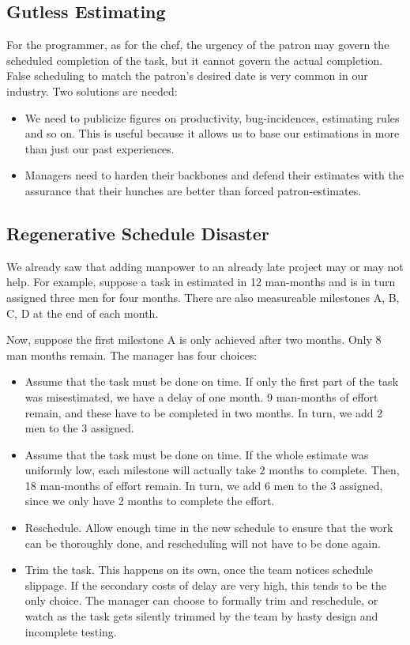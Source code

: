\documentclass[letterpaper,12pt,parskip=full]{article}
\begin{document}
\subsection{Gutless Estimating}

For the programmer, as for the chef, the urgency of the patron may govern the scheduled completion of the task, but it cannot govern the actual completion. False scheduling to match the patron’s desired date is very common in our industry. Two solutions are needed:

\begin{itemize}
	\item We need to publicize figures on productivity, bug-incidences, estimating rules and so on. This is useful because it allows us to base our estimations in more than just our past experiences.
	\item Managers need to harden their backbones and defend their estimates with the assurance that their hunches are better than forced patron-estimates.
\end{itemize}

\subsection{Regenerative Schedule Disaster}

We already saw that adding manpower to an already late project may or may not help. For example, suppose a task in estimated in 12 man-months and is in turn assigned three men for four months. There are also measureable milestones A, B, C, D at the end of each month. 

Now, suppose the first milestone A is only achieved after two months. Only 8 man months remain. The manager has four choices:

\begin{itemize}
	\item Assume that the task must be done on time. If only the first part of the task was misestimated, we have a delay of one month. 9 man-months of effort remain, and these have to be completed in two months. In turn, we add 2 men to the 3 assigned.
	\item Assume that the task must be done on time. If the whole estimate was uniformly low, each milestone will actually take 2 months to complete. Then, 18 man-months of effort remain. In turn, we add 6 men to the 3 assigned, since we only have 2 months to complete the effort.
	\item Reschedule. Allow enough time in the new schedule to ensure that the work can be thoroughly done, and rescheduling will not have to be done again.
	\item Trim the task. This happens on its own, once the team notices schedule slippage. If the secondary costs of delay are very high, this tends to be the only choice. The manager can choose to formally trim and reschedule, or watch as the task gets silently trimmed by the team by hasty design and incomplete testing.
\end{itemize}
\end{document}
